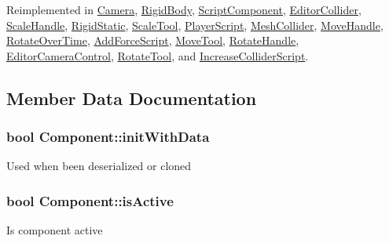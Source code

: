 Reimplemented in \hyperlink{class_camera_a8a9acaa6d1b9b5265fa714d0e24e9aee}{Camera}, \hyperlink{class_rigid_body_abf6a416e8bf2c2335bb2db145237ed4a}{Rigid\+Body}, \hyperlink{class_script_component_aa765fa62a343a8d83eb168d369b93a51}{Script\+Component}, \hyperlink{class_editor_collider_a0ffb1252a656a1ec84d3492052bf3cee}{Editor\+Collider}, \hyperlink{class_scale_handle_a524669abeef7f0f13edf8e3fd041d44d}{Scale\+Handle}, \hyperlink{class_rigid_static_a3eef6474e9396db05dc714e41154e793}{Rigid\+Static}, \hyperlink{class_scale_tool_a7ffc744426c942638ff24331de593496}{Scale\+Tool}, \hyperlink{class_player_script_a5cd8853a54348831521f0455df5b508c}{Player\+Script}, \hyperlink{class_mesh_collider_a3d68ab01f24a654638319600ac720d57}{Mesh\+Collider}, \hyperlink{class_move_handle_a39cb33cbbf841fee4d07c8a8cc380128}{Move\+Handle}, \hyperlink{class_rotate_over_time_a57f0412df19fefd4ab4dd11839c483e1}{Rotate\+Over\+Time}, \hyperlink{class_add_force_script_a8ad91eeecbfae666a28c44345d59251d}{Add\+Force\+Script}, \hyperlink{class_move_tool_ad38e6fcb03e6d7b2f0ef241ec0eb5271}{Move\+Tool}, \hyperlink{class_rotate_handle_a58b0a9ebbcd28378aed805628107eef4}{Rotate\+Handle}, \hyperlink{class_editor_camera_control_a829966c94f5f99911a20534692dcc78f}{Editor\+Camera\+Control}, \hyperlink{class_rotate_tool_a59f02b0a16d0fa6c48a8cf6d2e1fcd70}{Rotate\+Tool}, and \hyperlink{class_increase_collider_script_a7be665f5544316bfd2ad39c32e66b11f}{Increase\+Collider\+Script}.



\subsection{Member Data Documentation}
\hypertarget{class_component_aab9de8ee5f46e5cc42607bb9243ccd6d}{}
\subsubsection[{init\+With\+Data}]{\setlength{\rightskip}{0pt plus 5cm}bool Component\+::init\+With\+Data\hspace{0.3cm}{\ttfamily [protected]}}\label{class_component_aab9de8ee5f46e5cc42607bb9243ccd6d}
Used when been deserialized or cloned \hypertarget{class_component_a6dad4f819c0814eee8219e9b391cf583}{}
\subsubsection[{is\+Active}]{\setlength{\rightskip}{0pt plus 5cm}bool Component\+::is\+Active\hspace{0.3cm}{\ttfamily [protected]}}\label{class_component_a6dad4f819c0814eee8219e9b391cf583}
Is component active 

